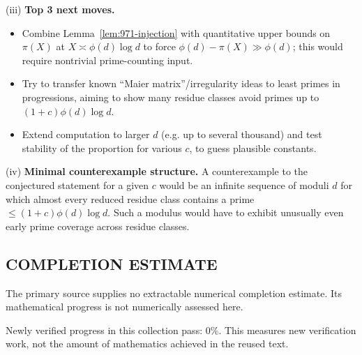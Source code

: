 (iii) \textbf{Top 3 next moves.}
\begin{itemize}
\item Combine Lemma~\ref{lem:971-injection} with quantitative upper bounds on $\pi(X)$ at $X\asymp \phi(d)\log d$ to force $\phi(d)-\pi(X)\gg \phi(d)$; this would require nontrivial prime-counting input.
\item Try to transfer known ``Maier matrix''/irregularity ideas to least primes in progressions, aiming to show many residue classes avoid primes up to $(1+c)\phi(d)\log d$.
\item Extend computation to larger $d$ (e.g. up to several thousand) and test stability of the proportion for various $c$, to guess plausible constants.
\end{itemize}

(iv) \textbf{Minimal counterexample structure.} A counterexample to the conjectured statement for a given $c$ would be an infinite sequence of moduli $d$ for which almost every reduced residue class contains a prime $\le (1+c)\phi(d)\log d$.  Such a modulus would have to exhibit unusually even early prime coverage across residue classes.




\subsection*{COMPLETION ESTIMATE}
The primary source supplies no extractable numerical completion estimate. Its mathematical progress is not numerically assessed here.

Newly verified progress in this collection pass: $0\%$. This measures new verification work, not the amount of mathematics achieved in the reused text.
